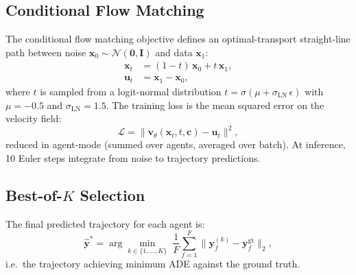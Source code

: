 \documentclass[11pt,a4paper]{article}
\begin{document}
\subsection{Conditional Flow Matching}
The conditional flow matching objective \citep{lipman2023flow} defines an optimal-transport straight-line path between noise $\mathbf{x}_0 \sim \mathcal{N}(\mathbf{0}, \mathbf{I})$ and data $\mathbf{x}_1$:
\begin{align}
\mathbf{x}_t &= (1-t)\,\mathbf{x}_0 + t\,\mathbf{x}_1, \\
\mathbf{u}_t &= \mathbf{x}_1 - \mathbf{x}_0,
\label{eq:fm_path}
\end{align}
where $t$ is sampled from a logit-normal distribution $t = \sigma(\mu + \sigma_{\mathrm{LN}}\,\epsilon)$ with $\mu = -0.5$ and $\sigma_{\mathrm{LN}} = 1.5$.  The training loss is the mean squared error on the velocity field:
\begin{equation}
\mathcal{L} = \bigl\|\mathbf{v}_\theta(\mathbf{x}_t, t, \mathbf{c}) - \mathbf{u}_t\bigr\|^2,
\label{eq:fm_loss}
\end{equation}
reduced in agent-mode (summed over agents, averaged over batch).  At inference, 10 Euler steps integrate from noise to trajectory predictions.

\subsection{Best-of-$K$ Selection}
The final predicted trajectory for each agent is:
\[
\hat{\mathbf{y}}^* = \arg\min_{k \in \{1,\dots,K\}}\;\frac{1}{F}\sum_{f=1}^{F}\bigl\|\mathbf{y}^{(k)}_f - \mathbf{y}^{\mathrm{gt}}_f\bigr\|_2,
\]
i.e.\ the trajectory achieving minimum ADE against the ground truth.
\end{document}
